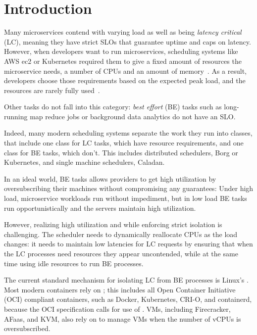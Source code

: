 \section{Introduction}
\label{s:intro}

Many microservices contend with varying load as well as being \textit{latency
critical} (LC), meaning they have strict SLOs that guarantee uptime and caps on
latency. However, when developers want to run microservices, scheduling systems
like AWS ec2 or Kubernetes required them to give a fixed amount of resources the
microservice needs, \ie{} a number of CPUs and an amount of memory~\cite{TODO}.
As a result, developers choose those requirements based on the expected peak
load, and the resources are rarely fully used~\cite{TODO}. 

Other tasks do not fall into this category: \textit{best effort} (BE) tasks such
as long-running map reduce jobs or background data analytics do not have an SLO.

Indeed, many modern scheduling systems separate the work they run into classes,
that include one class for LC tasks, which have resource requirements, and one
class for BE tasks, which don't. This includes distributed schedulers, \eg{}
Borg\cite{TODO} or Kubernetes\cite{TODO}, and single machine schedulers, \eg{}
Caladan\cite{TODO}. 

In an ideal world, BE tasks allows providers to get high utilization by
oversubscribing their machines without compromising any guarantees: Under high
load, microservice workloads run without impediment, but in low load BE tasks
run opportunistically and the servers maintain high utilization.

However, realizing high utilization and while enforcing strict isolation is
challenging. The scheduler needs to dynamically reallocate CPUs as the load
changes: it needs to maintain low latencies for LC requests by ensuring that
when the LC processes need resources they appear uncontended, while at the same
time using idle resources to run BE processes.

The current standard mechanism for isolating LC from BE processes is Linux's
\cgroups{}. Most modern containers rely on \cgroups{}; this includes all
Open Container Initiative (OCI) compliant containers, such as Docker,
Kubernetes, CRI-O, and containerd, because the OCI specification calls for use
of \cgroups{}. VMs, including Firecracker, AFaas, and KVM, also rely on
\cgroups{} to manage VMs when the number of vCPUs is oversubscribed.

